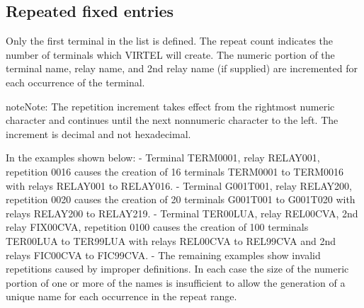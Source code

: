 \documentclass[letterpaper,10pt,english]{sphinxmanual}
\begin{document}


\subsection{Repeated fixed entries}
\label{\detokenize{connectivity_guide:repeated-fixed-entries}}
Only the first terminal in the list is defined. The repeat count indicates the number of terminals which VIRTEL will create. The numeric portion of the terminal name, relay name, and 2nd relay name (if supplied) are incremented for each occurrence of the terminal.

\begin{sphinxadmonition}{note}{Note:}
The repetition increment takes effect from the rightmost numeric character and continues until the next nonnumeric character to the left. The increment is decimal and not hexadecimal.
\end{sphinxadmonition}


In the examples shown below:
- Terminal TERM0001, relay RELAY001, repetition 0016 causes the creation of 16 terminals TERM0001 to TERM0016 with relays RELAY001 to RELAY016.
- Terminal G001T001, relay RELAY200, repetition 0020 causes the creation of 20 terminals G001T001 to G001T020 with relays RELAY200 to RELAY219.
- Terminal TER00LUA, relay REL00CVA, 2nd relay FIX00CVA, repetition 0100 causes the creation of 100 terminals TER00LUA to TER99LUA with relays REL00CVA to REL99CVA and 2nd relays FIC00CVA to FIC99CVA.
- The remaining examples show invalid repetitions caused by improper definitions. In each case the size of the numeric portion of one or more of the names is insufficient to allow the generation of a unique name for each occurrence in the repeat range.
\end{document}
